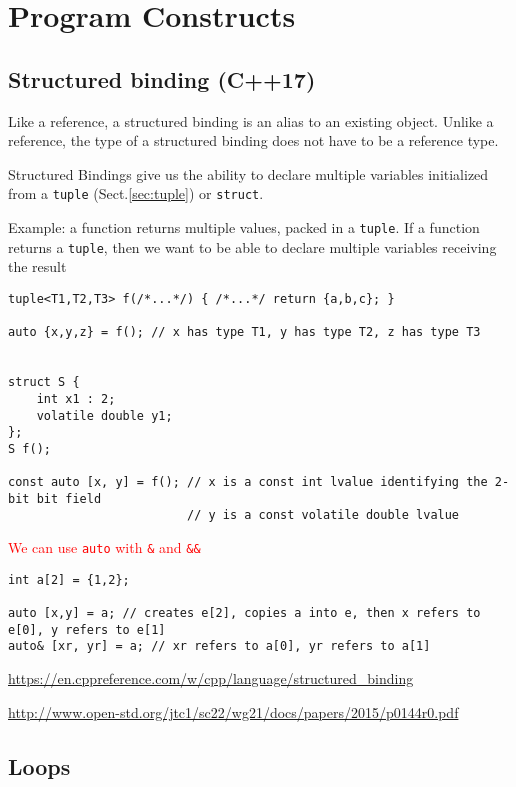 \chapter{Program Constructs}

\section{Structured binding (C++17)}
\label{sec:structured-binding}

Like a reference, a structured binding is an alias to an existing object. Unlike
a reference, the type of a structured binding does not have to be a reference
type.

Structured Bindings give us the ability to declare multiple variables
initialized from a \verb!tuple! (Sect.\ref{sec:tuple}) or \verb!struct!.

Example: a function returns multiple values, packed in a \verb!tuple!.
If a function returns a \verb!tuple!, then we want to be able to 
declare multiple variables receiving the result

\begin{verbatim}
tuple<T1,T2,T3> f(/*...*/) { /*...*/ return {a,b,c}; }

auto {x,y,z} = f(); // x has type T1, y has type T2, z has type T3


struct S {
    int x1 : 2;
    volatile double y1;
};
S f();
 
const auto [x, y] = f(); // x is a const int lvalue identifying the 2-bit bit field
                         // y is a const volatile double lvalue
\end{verbatim}

\textcolor{red}{We can use \verb!auto! with \verb!&! and \verb!&&!}
\begin{lstlisting}
int a[2] = {1,2};
 
auto [x,y] = a; // creates e[2], copies a into e, then x refers to e[0], y refers to e[1]
auto& [xr, yr] = a; // xr refers to a[0], yr refers to a[1]
\end{lstlisting}

\url{https://en.cppreference.com/w/cpp/language/structured_binding}

\url{http://www.open-std.org/jtc1/sc22/wg21/docs/papers/2015/p0144r0.pdf}

\section{Loops}

